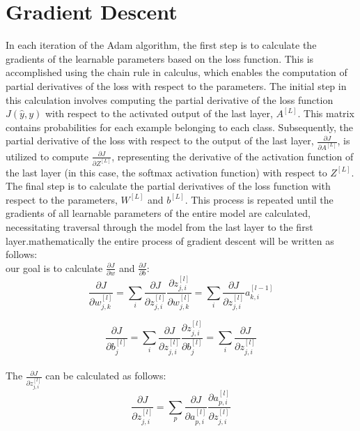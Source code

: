\documentclass[12pt]{article}
\begin{document}
\section*{\large Gradient Descent}

In each iteration of the Adam algorithm, the first step is to calculate the gradients of the learnable parameters based on the loss function. This is accomplished using the chain rule in calculus, which enables the computation of partial derivatives of the loss with respect to the parameters. The initial step in this calculation involves computing the partial derivative of the loss function $J(\hat{y}, y)$ with respect to the activated output of the last layer, $A^{[L]}$. This matrix contains probabilities for each example belonging to each class. Subsequently, the partial derivative of the loss with respect to the output of the last layer, $\frac{\partial{J}}{\partial{A^{[L]}}}$, is utilized to compute $\frac{\partial{J}}{\partial{Z^{[L]}}}$, representing the derivative of the activation function of the last layer (in this case, the softmax activation function) with respect to $Z^{[L]}$. The final step is to calculate the partial derivatives of the loss function with respect to the parameters, $W^{[L]}$ and $b^{[L]}$. This process is repeated until the gradients of all learnable parameters of the entire model are calculated, necessitating traversal through the model from the last layer to the first layer.mathematically the entire process of gradient descent will be written as follows: \\[15px]

our goal is to calculate $\frac{\partial{J}}{\partial{w}}$ and $\frac{\partial{J}}{\partial{b}}$:\\[6px]

$$\frac{\partial{J}}{\partial{w}^{[l]}_{j,k}}=\sum_i{\frac{\partial{J}}{\partial{z}^{[l]}_{j,i}}\frac{\partial{z}^{[l]}_{j,i}}{\partial{w}^{[l]}_{j,k}}}=\sum_i{\frac{\partial{J}}{\partial{z}^{[l]}_{j,i}}a^{[l-1]}_{k,i}}$$ 
 
$$\frac{\partial{J}}{\partial{b}^{[l]}_{j}}=\sum_i{\frac{\partial{J}}{\partial{z}^{[l]}_{j,i}}\frac{\partial{z}^{[l]}_{j,i}}{\partial{b}^{[l]}_{j}}}=\sum_i{\frac{\partial{J}}{\partial{z}^{[l]}_{j,i}}}$$\\[6px]

The $\frac{\partial{J}}{\partial{z}^{[l]}_{j,i}}$ can be calculated as follows:\\[6px]

$$\frac{\partial{J}}{\partial{z}^{[l]}_{j,i}}=\sum_p{\frac{\partial{J}}{\partial{a}^{[l]}_{p,i}}\frac{\partial{a}^{[l]}_{p,i}}{\partial{z}^{[l]}_{j,i}}}$$ 
\end{document}
